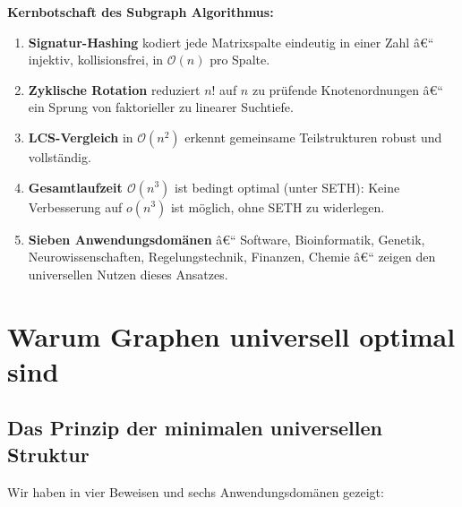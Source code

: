 ﻿\documentclass[12pt,a4paper,twoside]{article}
\theoremstyle{definition}
\theoremstyle{plain}
\theoremstyle{remark}
\begin{document}
\textbf{Kernbotschaft des Subgraph Algorithmus:}
\begin{enumerate}
  \item \textbf{Signatur-Hashing} kodiert jede Matrixspalte
        eindeutig in einer Zahl â€“ injektiv, kollisionsfrei,
        in $\mathcal{O}(n)$ pro Spalte.
  \item \textbf{Zyklische Rotation} reduziert $n!$ auf $n$
        zu prüfende Knotenordnungen â€“ ein Sprung von
        faktorieller zu linearer Suchtiefe.
  \item \textbf{LCS-Vergleich} in $\mathcal{O}(n^2)$ erkennt
        gemeinsame Teilstrukturen robust und vollständig.
  \item \textbf{Gesamtlaufzeit $\mathcal{O}(n^3)$} ist
        bedingt optimal (unter SETH): Keine Verbesserung
        auf $o(n^3)$ ist möglich, ohne SETH zu widerlegen.
  \item \textbf{Sieben Anwendungsdomänen} â€“ Software,
        Bioinformatik, Genetik, Neurowissenschaften,
        Regelungstechnik, Finanzen, Chemie â€“ zeigen den
        universellen Nutzen dieses Ansatzes.
\end{enumerate}

\section{Warum Graphen universell optimal sind}
\label{sec:synthese}

\subsection{Das Prinzip der minimalen universellen Struktur}

Wir haben in vier Beweisen und sechs Anwendungsdomänen
gezeigt:
\end{document}
